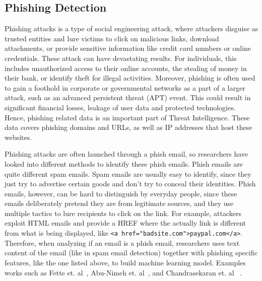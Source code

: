 \subsection{Phishing Detection}
Phishing attacks is a type of social engineering attack, where attackers 
disguise as trusted entities and lure victims to click on malicious links, 
download attachments, or provide sensitive information like credit card
numbers or online credentials. These attack can have devastating results. 
For individuals, this includes unauthorized access to their online 
accounts, the stealing of money in their bank, or identify theft for illegal
activities. Moreover, phishing is often used to gain a foothold in corporate 
or governmental networks as a part of a larger attack, such as an 
advanced persistent threat (APT) event. This could result in significant
financial losses, leakage of user data and protected technologies. Hence,
phishing related data is an important part of Threat Intelligence. These data
covers phishing domains and URLs, as well as IP addresses that host these
websites. 

Phishing attacks are often launched through a phish email, so researchers
have looked into different methods to identify these phish emails. Phish emails
are quite different spam emails. Spam emails are usually easy to identify,
since they just try to advertise certain goods and don't try to conceal 
their identities. Phish emails, however, can be hard to distinguish by 
everyday people, since these emails deliberately pretend they are
from legitimate sources, and they use multiple tactics to lure recipients
to click on the link. For example, attackers exploit HTML emails and
provide a HREF where the actually link is different from what is being 
displayed, like \texttt{<a href="badsite.com">paypal.com</a>}. Therefore,
when analyzing if an email is a phish email, researchers uses text content
of the email (like in spam email detection) together with phishing specific 
features, like the one listed above, to build machine learning model. 
Examples works such as Fette et. al~\cite{fette2007learning}, Abu-Nimeh 
et. al~\cite{abu2007comparison}, and Chandrasekaran et. al
~\cite{chandrasekaran2006phishing}.

